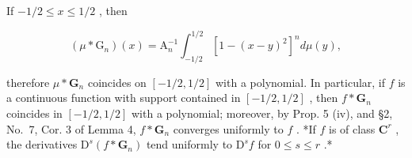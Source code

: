 If \(-1 / 2\leqslant x\leqslant 1 / 2\) , then

\[
(\mu * \mathrm{G} _ {n}) (x) = \mathrm{A} _ {n} ^ {- 1} \int_ {- 1 / 2} ^ {1 / 2} [ 1 - (x - y) ^ {2} ] ^ {n} d \mu (y),
\]

therefore \(\mu * \mathbf{G}_n\) coincides on \([-1/2, 1/2]\) with a polynomial. In particular, if \(f\) is a continuous function with support contained in \([-1/2, 1/2]\) , then \(f * \mathbf{G}_n\) coincides in \([-1/2, 1/2]\) with a polynomial; moreover, by Prop. 5 (iv), and §2, No.~7, Cor. 3 of Lemma 4, \(f * \mathbf{G}_n\) converges uniformly to \(f\) . *If \(f\) is of class \(\mathbf{C}^r\) , the derivatives \(\mathrm{D}^s(f * \mathbf{G}_n)\) tend uniformly to \(\mathrm{D}^s f\) for \(0 \leqslant s \leqslant r\) .*

